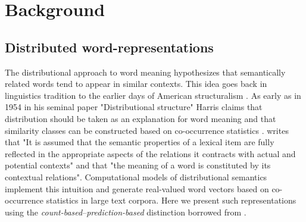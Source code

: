 \begin{comment}
Chapter~\ref{ch:COLI} introduces a recurrent and convolutional neural network
based model that learns from both visual-grounding signals and
word-word co-occurrences. We develop techniques to interpret the learned
representations of such an architecture and investigate if certain linguistic
phenomena is encoded in the learned model.

Chapter~\ref{ch:IJCNLP} provides empirical evidence that grounded learning
can improve machine translation quality.
In Chapter~\ref{ch:ConLL} we show under what conditions multilinguality an help improve grounded
representations.


\end{comment}

\chapter{Background}
\label{ch:background}

\section{Distributed word-representations}
\label{sec:words}
The distributional approach to word meaning hypothesizes that semantically related words
tend to appear in similar contexts. This idea goes back in linguistics tradition to the
earlier days of American structuralism \citep{nevin2002legacy}.
As early as in 1954 in his seminal paper "Distributional structure" Harris claims
that distribution should be taken as an explanation for word meaning and that similarity classes
can be constructed based on co-occurrence statistics \citep{harris1954distributional}.
\cite{cruse1986lexical} writes that "It is  assumed  that  the  semantic properties  of
a lexical  item  are  fully  reflected  in  the  appropriate  aspects  of  the  relations
it  contracts  with  actual  and  potential  contexts" and that "the  meaning  of  a word
is constituted  by  its  contextual  relations". Computational models of distributional
semantics implement this intuition and generate real-valued word vectors based on co-occurrence
statistics in large text corpora. Here we present such representations using the \emph{count-based}--\emph{prediction-based} distinction borrowed from \cite{baroni2014don}.


